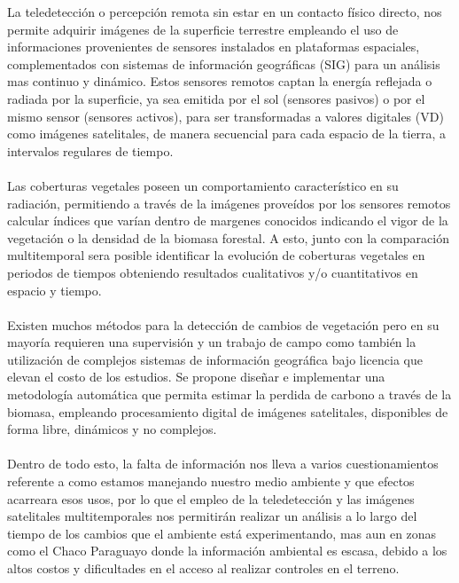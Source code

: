 La teledetecci\'on o percepci\'on remota sin estar en un contacto f\'isico directo, nos permite adquirir im\'agenes de la superficie terrestre\cite{lillesand1994remote} empleando el uso de informaciones provenientes de sensores instalados en plataformas espaciales, complementados con sistemas de informaci\'on geogr\'aficas (SIG) para un an\'alisis mas continuo y din\'amico. Estos sensores remotos captan la energ\'ia reflejada o radiada por la superficie, ya sea emitida por el sol (sensores pasivos) o por el mismo sensor (sensores activos), para ser transformadas a valores digitales (VD) como im\'agenes satelitales, de manera secuencial para cada espacio de la tierra, a intervalos regulares de tiempo.\\~\\
Las coberturas vegetales poseen un comportamiento caracter\'istico en su radiaci\'on, permitiendo a trav\'es de la im\'agenes prove\'idos por los sensores remotos calcular \'indices que var\'ian dentro de margenes conocidos indicando el vigor de la vegetaci\'on o la densidad de la biomasa forestal. A esto, junto con la comparaci\'on multitemporal sera posible identificar la evoluci\'on de coberturas vegetales en periodos de tiempos obteniendo resultados cualitativos y/o cuantitativos en espacio y tiempo\cite{martinez2013normalizacion}.\\~\\
Existen muchos m\'etodos para la detecci\'on de cambios de vegetaci\'on pero en su mayor\'ia requieren una supervisi\'on y un trabajo de campo como tambi\'en la utilizaci\'on de complejos sistemas de informaci\'on geogr\'afica bajo licencia que elevan el costo de los estudios. Se propone dise\~{n}ar e implementar una metodolog\'ia autom\'atica que permita estimar la perdida de carbono a trav\'es de la biomasa, empleando procesamiento digital de im\'agenes satelitales, disponibles de forma libre, din\'amicos y no complejos.\\~\\
Dentro de todo esto, la falta de informaci\'on nos lleva a varios cuestionamientos referente a como estamos manejando nuestro medio ambiente y que efectos acarreara esos usos, por lo que el empleo de la teledetecci\'on y las im\'agenes satelitales multitemporales nos permitir\'an realizar un an\'alisis a lo largo del tiempo de los cambios que el ambiente est\'a experimentando, mas aun en zonas como el Chaco Paraguayo donde la informaci\'on ambiental es escasa, debido a los altos costos y dificultades en el acceso al realizar controles en el terreno.

